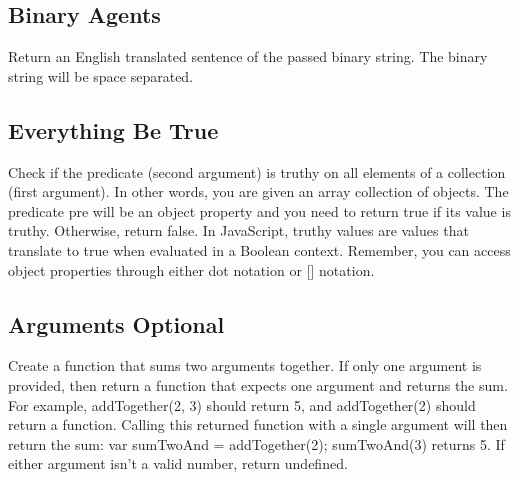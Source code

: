 \documentclass{article}%
\begin{document}
%
\subsection{Binary Agents}%
\label{subsec:BinaryAgents}%
Return an English translated sentence of the passed binary string.\newline%
The binary string will be space separated.\newline%

%
\subsection{Everything Be True}%
\label{subsec:EverythingBeTrue}%
Check if the predicate (second argument) is truthy on all elements of a collection (first argument).\newline%
In other words, you are given an array collection of objects. The predicate pre will be an object property and you need to return true if its value is truthy. Otherwise, return false.\newline%
In JavaScript, truthy values are values that translate to true when evaluated in a Boolean context.\newline%
Remember, you can access object properties through either dot notation or {[}{]} notation.\newline%

%
\subsection{Arguments Optional}%
\label{subsec:ArgumentsOptional}%
Create a function that sums two arguments together. If only one argument is provided, then return a function that expects one argument and returns the sum.\newline%
For example, addTogether(2, 3) should return 5, and addTogether(2) should return a function.\newline%
Calling this returned function with a single argument will then return the sum:\newline%
var sumTwoAnd = addTogether(2);\newline%
sumTwoAnd(3) returns 5.\newline%
If either argument isn't a valid number, return undefined.\newline%

%
\end{document}
